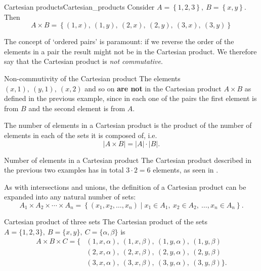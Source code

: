 \begin{example}{Cartesian products}{Cartesian_products}
	Consider $A=\left\{ 1,2,3 \right\},\ B=\left\{ x, y \right\}$. Then
	\[
		A\times B = \left\{ \left( 1,x \right),\ \left( 1,y \right),\ \left( 2,x \right),\ \left( 2,y \right),\ \left( 3,x \right),\ \left( 3,y \right) \right\}
	\]
\end{example}

The concept of `ordered pairs' is paramount: if we reverse the order of the elements in a pair the result might not be in the Cartesian product. We therefore say that the Cartesian product is \emph{not commutative}.

\begin{example}{Non-commutivity of the Cartesian product}{}
	The elements $(x,1),\ (y,1),\ (x,2)$ and so on \textbf{are not} in the Cartesian product $A\times B$ as defined in the previous example, since in each one of the pairs the first element is from $B$ and the second element is from $A$.
\end{example}

The number of elements in a Cartesian product is the product of the number of elements in each of the sets it is composed of, i.e.
\begin{equation}
	|A\times B| = |A|\cdot|B|.
	\label{eq:number_of_elements_Cartesian_product}
\end{equation}

\begin{example}{Number of elements in a Cartesian product}{}
	The Cartesian product described in the previous two examples has in total $3\cdot2=6$ elements, as seen in .
\end{example}

As with intersections and unions, the definition of a Cartesian product can be expanded into any natural number of sets:
\begin{equation}
	A_{1}\times A_{2}\times \cdots \times A_{n} = \left\{ \left( x_{1},x_{2},\dots,x_{n} \right) \mid x_{1}\in A_{1},\ x_{2}\in A_{2},\ \dots, x_{n}\in A_{n} \right\}.
	\label{eq:Cartesian_product_multiple_sets}
\end{equation}

\begin{example}{Cartesian product of three sets}{}
	The Cartesian product of the sets $A=\{1,2,3\},\ B=\{x,y\},\ C=\{\alpha,\beta\}$ is
	\begin{align*}
		A\times B\times C = \{
			&(1,x,\alpha),\ (1,x,\beta),\ (1,y,\alpha),\ (1,y,\beta)\\
			&(2,x,\alpha),\ (2,x,\beta),\ (2,y,\alpha),\ (2,y,\beta)\\
			&(3,x,\alpha),\ (3,x,\beta),\ (3,y,\alpha),\ (3,y,\beta)
		\}.
	\end{align*}
\end{example}

